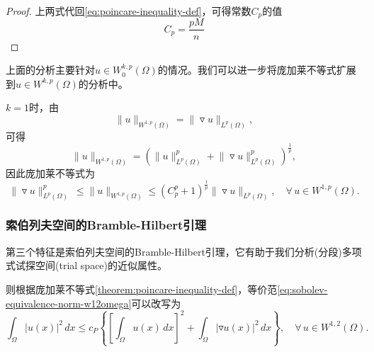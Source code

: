 \begin{proof}
上两式代回\eqref{eq:poincare-inequality-def}，可得常数$C_p$的值
\begin{equation*}
  C_p = \frac{p M}{n}
\end{equation*}
\end{proof}

上面的分析主要针对$u \in W^{k,p}_{0}(\Omega)$的情况。我们可以进一步将庞加莱不等式扩展到$u \in W^{k,p}(\Omega)$的分析中。
\begin{corollary}
  \label{corollary:poincare-inequality-unbounded-def}
  $k=1$时，由
  \begin{equation*}
    \big\| u \big\|_{W^{1,p}(\Omega)} = \big\| \triangledown u \big\|_{L^p(\Omega)},
  \end{equation*}
  可得
  \begin{equation*}
    \big\| u \big\|_{W^{1,p}(\Omega)} =
    \left(
    \big\| u \big\|^{p}_{L^p(\Omega)}
    +\big\| \triangledown u \big\|^p_{L^p(\Omega)}
    \right)^{\frac{1}{p}},
  \end{equation*}
  因此庞加莱不等式为
  \begin{equation}
    \label{eq:poincare-inequality-unbounded-def}
    \big\| \triangledown u \big\|^p_{L^p(\Omega)} \
    \le \big\| u \big\|_{W^{1,p}(\Omega)}
    \le \left(C_p^p + 1 \right)^{\frac{1}{p}}
    \big\| \triangledown u \big\|_{L^p(\Omega)}, \quad \forall \, u \in W^{1,p}(\Omega).
  \end{equation}
\end{corollary}

\subsubsection{索伯列夫空间的Bramble-Hilbert引理}
\label{sec:sobolev-bramble-hilbert-lemma}
第三个特征是索伯列夫空间的Bramble-Hilbert引理，它有助于我们分析(分段)多项式试探空间(trial space)的近似属性\citep[Sec 2.3.1]{Jovanovic:2014iy}。

则根据庞加莱不等式\eqref{theorem:poincare-inequality-def}，等价范\eqref{eq:sobolev-equivalence-norm-w12omega}可以改写为
\begin{equation}
  \label{eq:sobolev-poincare-inequality}
  \int_{\Omega} \big| u(x) \big|^2 \, dx  \le c_P \left\{
  \left[
  \int_{\Omega} u(x) \, dx
  \right]^2
  + \int_{\Omega} \left| \triangledown u(x) \right|^2 \, dx
  \right\}, \quad \forall \, u \in W^{1,2}(\Omega).
\end{equation}

